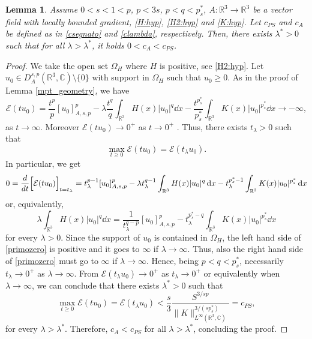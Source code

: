 \documentclass[leqno,11pt]{amsart}
\newcommand{\R}{\mathbb R}
\newcommand{\CC}{\mathbb C}
\newcommand{\C}{\mathbb C}
\newcommand{\cE}{{\mathcal E}}
\numberwithin{equation}{section}
\newtheorem{lemma}[theorem]{Lemma}
\begin{document}
\begin{lemma}\label{c<csegnato}
Assume $0<s<1<p$, $p<3s$, $p< q<p^*_s$, $A:\R^3\to \R^3$ be a vector field with locally bounded gradient, \eqref{H:hyp}, \eqref{H2:hyp} and \eqref{K:hyp}. Let $c_{PS}$ and $c_A$ be defined as in \eqref{csegnato} and \eqref{clambda}, respectively.  Then, there exists $\lambda^*>0$ such that for all $\lambda>\lambda^{*}$, it holds $0< c_A<c_{PS}$.
\end{lemma}


\begin{proof}
We take the open set $\Omega_H$ where $H$ is positive, see \eqref{H2:hyp}. Let $u_0\in D^{s,p}_A(\R^3,\C)\setminus \{0\}$ with support in
$\Omega_H$ such that $u_0\ge0$. As in the proof of Lemma \ref{mpt_geometry}, we have
\begin{equation}
    \cE(tu_0)= \frac{t^p}{p}[u_0]_{A,s,p}^p - \lambda\frac{t^q}{q}\int_{\R^3}H(x) |u_0|^q \dd x-\frac{t^{p^*_s}}{p^*_s}\int_{\R^3}K(x) |u_0|^{p^*_s} \dd x \to -\infty,
\end{equation}
as $t\to\infty$. Moreover $\cE(tu_0)\to 0^+$ as $t\to0^+$ .
Thus, there exists $t_\lambda>0$ such that
$$
    \max_{t\ge 0}\cE(tu_0)=\cE(t_\lambda u_0).
$$
In particular, we get
$$
    0=\frac{d}{dt}\Bigl[\cE(tu_0)\Bigr]_{t=t_\lambda}=t_\lambda^{p-1}[u_0]_{A,s,p}^p-\lambda t_\lambda^{q-1}\int_{\R^3}H(x) |u_0|^q\dd x - t_\lambda^{p^*_s-1}\int_{\R^3}K(x) | u_0|^{p^*_s} \dd x
$$
or, equivalently,
\begin{equation}\label{primozero}
    \lambda \int_{\R^3}H(x) |u_0|^q\dd x=
    \frac{1}{t_\lambda^{q-p}}[u_0]_{A,s,p}^p - t_\lambda^{p^*_s-q} \int_{\R^3}K(x) | u_0|^{p^*_s} \dd x
\end{equation}
for every $\lambda>0$. Since the support of $u_0$ is contained in $\Omega_H$, the left hand side of \eqref{primozero} is positive and it goes to $\infty$ if $\lambda\to\infty$. Thus, also the right hand side of \eqref{primozero} must go to $\infty$ if $\lambda\to\infty$. Hence, being $p<q<p^*_s$, necessarily $t_\lambda\to 0^+$ as $\lambda\to\infty$. From $\cE(t_\lambda u_0)\to 0^+$ as $t_\lambda\to0^+$ or equivalently when $\lambda\to\infty$, we can conclude that there exists $\lambda^{*}>0$ such that
$$
    \max_{t\ge0}\cE(tu_0)=\cE(t_\lambda u_0)<\frac{s}{3}\frac{S^{3/sp}}{ \|K\|_{L^\infty(\R^3, \CC)}^{3/(sp^*_s)}}=c_{PS},
$$
for every $\lambda>\lambda^{*}$. Therefore, $c_A<c_{PS}$
for all $\lambda>\lambda^{*}$, concluding the proof.
\end{proof}
\end{document}
